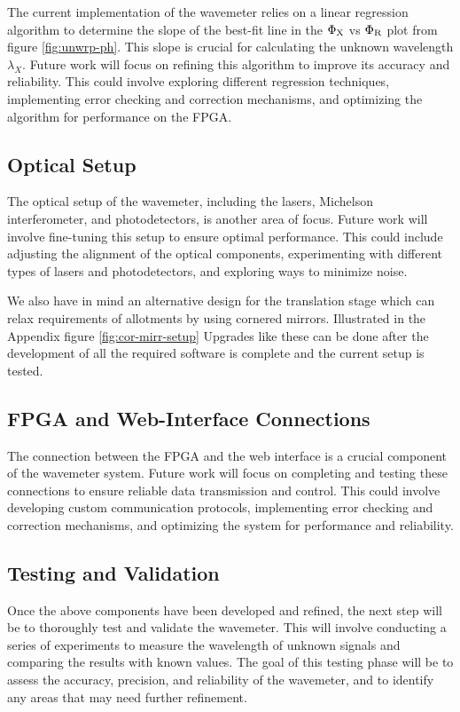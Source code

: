 \documentclass[12pt, twoside]{report}
\begin{document}
The current implementation of the wavemeter relies on a linear regression algorithm to determine the slope of the best-fit line in the $\Phi_{\text X}$ vs $\Phi_{\text R}$ plot from figure \ref{fig:unwrp-ph}. This slope is crucial for calculating the unknown wavelength $\lambda_X$. Future work will focus on refining this algorithm to improve its accuracy and reliability. This could involve exploring different regression techniques, implementing error checking and correction mechanisms, and optimizing the algorithm for performance on the FPGA.

\subsection{Optical Setup}

The optical setup of the wavemeter, including the lasers, Michelson interferometer, and photodetectors, is another area of focus. Future work will involve fine-tuning this setup to ensure optimal performance. This could include adjusting the alignment of the optical components, experimenting with different types of lasers and photodetectors, and exploring ways to minimize noise. 

\vspace{1em}
We also have in mind an alternative design for the translation stage which can relax requirements of allotments by using cornered mirrors. Illustrated in the Appendix figure \ref{fig:cor-mirr-setup} Upgrades like these can be done after the development of all the required software is complete and the current setup is tested. 

\subsection{FPGA and Web-Interface Connections}

The connection between the FPGA and the web interface is a crucial component of the wavemeter system. Future work will focus on completing and testing these connections to ensure reliable data transmission and control. This could involve developing custom communication protocols, implementing error checking and correction mechanisms, and optimizing the system for performance and reliability.

\subsection{Testing and Validation}

Once the above components have been developed and refined, the next step will be to thoroughly test and validate the wavemeter. This will involve conducting a series of experiments to measure the wavelength of unknown signals and comparing the results with known values. The goal of this testing phase will be to assess the accuracy, precision, and reliability of the wavemeter, and to identify any areas that may need further refinement.
\end{document}
